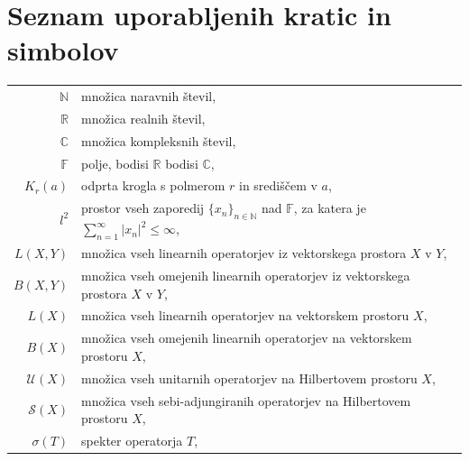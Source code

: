 \documentclass[12pt,a4paper,oneside,fleqn,openany]{book}
\newcommand{\R}{\mathbb{R}}
\newcommand{\F}{\mathbb{F}}
\newcommand{\N}{\mathbb{N}}
\newcommand{\C}{\mathbb{C}}
\newcommand{\abs}[1]{\ensuremath{\lvert #1 \rvert}}
\begin{document}
\chapter*{Seznam uporabljenih kratic in simbolov}
\begin{table}[!ht]
		\begin{tabular}{r l}
			$\N$ & množica naravnih števil,\\
			$\R$ & množica realnih števil,\\
			$\C$ & množica kompleksnih števil,\\
			$\F$ & polje, bodisi $\R$ bodisi $\C$,\\
			$K_r(a)$ & odprta krogla s polmerom $r$ in središčem v $a$,\\
			$l^2$ & prostor vseh zaporedij $\{x_n\}_{n\in\N}$ nad $\F$, za katera je $\sum_{n = 1}^\infty\abs{x_n}^2 \leq \infty$,\\
			$L(X, Y)$ & množica vseh linearnih operatorjev iz vektorskega prostora $X$ v $Y$,\\
			$B(X, Y)$ & množica vseh omejenih linearnih operatorjev iz vektorskega prostora $X$ v $Y$,\\
			$L(X)$ & množica vseh linearnih operatorjev na vektorskem prostoru $X$,\\
			$B(X)$ & množica vseh omejenih linearnih operatorjev na vektorskem prostoru $X$,\\
			$\mathcal{U}(X)$ & množica vseh unitarnih operatorjev na Hilbertovem prostoru $X$,\\
			$\mathcal{S}(X)$ & množica vseh sebi-adjungiranih operatorjev na Hilbertovem prostoru $X$,\\
			$\sigma(T)$ & spekter operatorja $T$,\\
		\end{tabular}
\end{table}






\end{document}
